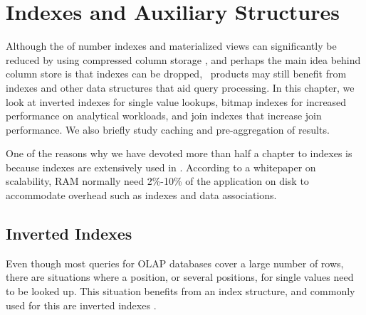 \chapter{Indexes and Auxiliary Structures}
\label{chap:Indexes and Auxiliary Structures}

Although the of number indexes and materialized views can significantly be reduced by using compressed column storage \cite{Lahiri2015-mz}, and perhaps the main idea behind column store is that indexes can be dropped, \bd~products may still benefit from indexes and other data structures that aid query processing. In this chapter, we look at inverted indexes for single value lookups, bitmap indexes for increased performance on analytical workloads, and join indexes that increase join performance. We also briefly study caching and pre-aggregation of results.

One of the reasons why we have devoted more than half a chapter to indexes is because indexes are extensively used in \qlikview. According to a whitepaper on scalability, RAM normally need 2\%-10\% of the application on disk to accommodate overhead such as indexes and data associations.

\newpage

\section{Inverted Indexes}
\label{sec:Inverted Indexes}



Even though most queries for OLAP databases cover a large number of rows, there are situations where a position, or several positions, for single values need to be looked up. This situation benefits from an index structure, and commonly used for this are inverted indexes \cite{Lemke2010-is}. 

